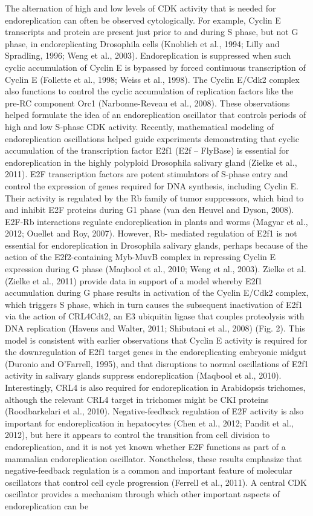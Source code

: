 \documentclass[11pt,twoside,a4paper]{report}
\begin{document}
			The alternation of high and low levels of CDK activity that is needed for endoreplication can often be observed cytologically. For example, Cyclin E transcripts and protein are present just prior to and during S phase, but not G phase, in endoreplicating Drosophila cells (Knoblich et al., 1994; Lilly and Spradling, 1996; Weng et al., 2003). Endoreplication is suppressed when such cyclic accumulation of Cyclin E is bypassed by forced continuous transcription of Cyclin E (Follette et al., 1998; Weiss et al., 1998). The Cyclin E/Cdk2 complex also functions to control the cyclic accumulation of replication factors like the pre-RC component Orc1 (Narbonne-Reveau et al., 2008). These observations helped formulate the idea of an endoreplication oscillator that controls periods of high and low S-phase CDK activity. Recently, mathematical modeling of endoreplication oscillations helped guide experiments demonstrating that cyclic accumulation of the transcription factor E2f1 (E2f – FlyBase) is essential for endoreplication in the highly polyploid Drosophila salivary gland (Zielke et al., 2011). E2F transcription factors are potent stimulators of S-phase entry and control the expression of genes required for DNA synthesis, including Cyclin E. Their activity is regulated by the Rb family of tumor suppressors, which bind to and inhibit E2F proteins during G1 phase (van den Heuvel and Dyson, 2008). E2F-Rb interactions regulate endoreplication in plants and worms (Magyar et al., 2012; Ouellet and Roy, 2007). However, Rb- mediated regulation of E2f1 is not essential for endoreplication in Drosophila salivary glands, perhaps because of the action of the E2f2-containing Myb-MuvB complex in repressing Cyclin E expression during G phase (Maqbool et al., 2010; Weng et al., 2003). Zielke et al. (Zielke et al., 2011) provide data in support of a model whereby E2f1 accumulation during G phase results in activation of the Cyclin E/Cdk2 complex, which triggers S phase, which in turn causes the subsequent inactivation of E2f1 via the action of CRL4Cdt2, an E3 ubiquitin ligase that couples proteolysis with DNA replication (Havens and Walter, 2011; Shibutani et al., 2008) (Fig. 2). This model is consistent with earlier observations that Cyclin E activity is required for the downregulation of E2f1 target genes in the endoreplicating embryonic midgut (Duronio and O’Farrell, 1995), and that disruptions to normal oscillations of E2f1 activity in salivary glands suppress endoreplication (Maqbool et al., 2010). Interestingly, CRL4 is also required for endoreplication in Arabidopsis trichomes, although the relevant CRL4 target in trichomes might be CKI proteins (Roodbarkelari et al., 2010). Negative-feedback regulation of E2F activity is also important for endoreplication in hepatocytes (Chen et al., 2012; Pandit et al., 2012), but here it appears to control the transition from cell division to endoreplication, and it is not yet known whether E2F functions as part of a mammalian endoreplication oscillator. Nonetheless, these results emphasize that negative-feedback regulation is a common and important feature of molecular oscillators that control cell cycle progression (Ferrell et al., 2011). A central CDK oscillator provides a mechanism through which other important aspects of endoreplication can be 
\end{document}
